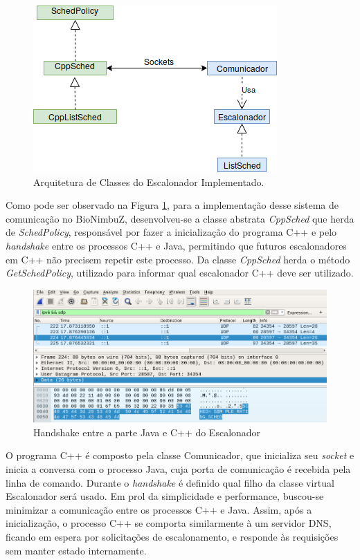 \begin{figure}[htbp]
	\centerline{\includegraphics[scale=0.7]{img/Proposta.png}}
	\caption{Arquitetura de Classes do Escalonador Implementado.}
	\label{ArquiteturaProposta}
\end{figure}


Como pode ser observado na Figura \ref{ArquiteturaProposta}, para a implementação desse sistema de comunicação no BioNimbuZ, desenvolveu-se a classe abstrata \textit{CppSched} que herda de \textit{SchedPolicy}, responsável por fazer a inicialização do programa C++ e pelo \textit{handshake} entre os processos C++ e Java, permitindo que futuros escalonadores em C++ não precisem repetir este processo. Da classe \textit{CppSched} herda o método \textit{GetSchedPolicy}, utilizado para informar qual escalonador C++ deve ser utilizado.

\begin{figure}[htbp]
	\centerline{\includegraphics[width=13cm]{img/Handshake3.png}}
	\caption{Handshake entre a parte Java e C++ do Escalonador}
	\label{Handshake}
\end{figure}

O programa C++ é composto pela classe Comunicador, que inicializa seu \textit{socket} e inicia a conversa com o processo Java, cuja porta de comunicação é recebida pela linha de comando. Durante o \textit{handshake} é definido qual filho da classe virtual Escalonador será usado. Em prol da simplicidade e performance, buscou-se minimizar a comunicação entre os processos C++ e Java. Assim, após a inicialização, o processo C++ se comporta similarmente à um servidor \acrshort{DNS}\cite{dns_rfc}, ficando em espera por solicitações de escalonamento, e responde às requisições sem manter estado internamente.


